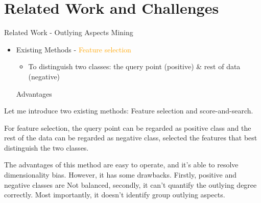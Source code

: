\documentclass[
 size=14pt,
 paper=smartboard,  %
 mode=present, 		%
 display=slides, 	%
 style=tuliplab,  	%
 pauseslide,
 fleqn,leqno]{powerdot}
\begin{document}
\section{Related Work and Challenges}


\begin{slide}{Related Work - Outlying Aspects Mining}
\begin{itemize}
\item
Existing Methods - \textcolor{orange}{Feature selection}

\begin{itemize}
\item
To distinguish two classes:
the query point (positive) \& rest of data (negative)
\end{itemize}
\vspace{1cm}
{
Advantages

}
\end{itemize}

\begin{note}
Let me introduce two existing methods:
Feature selection and score-and-search.

For feature selection,
the query point can be regarded as positive class and
the rest of the data can be regarded as negative class,
selected the features that best distinguish the two classes.

The advantages of this method are easy to operate,
and it's able to resolve dimensionality bias.
However, it has some drawbacks.
Firstly,
positive and negative classes are Not balanced,
secondly,
it can't quantify the outlying degree correctly.
Most importantly,
it doesn't identify group outlying aspects.
\end{note}

\end{slide}
\end{document}
